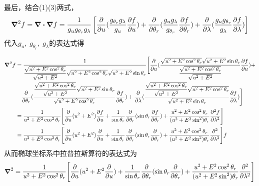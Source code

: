 \documentclass{article}
\begin{document}
最后，结合(1)(3)两式，
\[
\grad^2 f = \div \grad f = \frac{1}{g_u g_{\theta_r} g_\lambda}\left[\frac{\partial}{\partial u} (\frac{g_{\theta_r} g_{\lambda}}{g_{u}}\frac{\partial f}{\partial u}) + \frac{\partial}{\partial \theta_r} (\frac{g_u g_{\lambda}}{g_{\theta_r}}\frac{\partial f}{\partial \theta_r}) + \frac{\partial}{\partial \lambda} (\frac{g_u g_{\theta_r}}{g_\lambda}\frac{\partial f}{\partial \lambda}) \right]
\]
代入$g_u,\;g_{\theta_r},\;g_\lambda$的表达式得
\newcommand{\gu}{\dfrac{\sqrt{u^2 + E^2\cos^2\theta_r}}{\sqrt{u^2+E^2}}}
\newcommand{\gthetar}{\sqrt{u^2 + E^2\cos^2\theta_r}}
\newcommand{\glambda}{\sqrt{u^2+E^2}\sin\theta_r}

\begin{align*}
\grad^2 f & =  \dfrac{1}{\gu \gthetar \glambda}\Bigg[\dfrac{\partial}{\partial u} (\dfrac{\gthetar \glambda}{\gu}\dfrac{\partial f}{\partial u}) + \\ & \quad \dfrac{\partial}{\partial \theta_r} (\dfrac{\gu \glambda}{\gthetar}\dfrac{\partial f}{\partial \theta_r}) + \dfrac{\partial}{\partial \lambda}  (\dfrac{\gu\gthetar}{\glambda}\dfrac{\partial f}{\partial \lambda}) \Bigg]\\
& = \frac{1}{u^2+E^2\cos^2\theta_r}\Bigg[\dfrac{\partial}{\partial u}(u^2+E^2) \dfrac{\partial f}{\partial u} + \frac{1}{\sin \theta_r}\dfrac{\partial}{\partial \theta_r}(\sin \theta_r \dfrac{\partial f}{\partial \theta_r}) + \dfrac{u^2 + E^2 \cos^2 \theta_r }{(u^2+E^2\sin^2)\theta_r} \dfrac{\partial^2 f}{\partial \lambda^2}\Bigg]\\
& = \frac{1}{u^2+E^2\cos^2\theta_r}\Bigg[\dfrac{\partial}{\partial u}(u^2+E^2) \dfrac{\partial}{\partial u} + \frac{1}{\sin \theta_r}\dfrac{\partial}{\partial \theta_r}(\sin \theta_r \dfrac{\partial}{\partial \theta_r}) + \dfrac{u^2 + E^2 \cos^2 \theta_r }{(u^2+E^2\sin^2)\theta_r} \dfrac{\partial^2}{\partial \lambda^2}\Bigg] f
\end{align*}
从而椭球坐标系中拉普拉斯算符的表达式为
\[
\grad^2 = \frac{1}{u^2+E^2\cos^2\theta_r}\Bigg[\dfrac{\partial}{\partial u}(u^2+E^2 \dfrac{\partial}{\partial u}) + \frac{1}{\sin \theta_r}\dfrac{\partial}{\partial \theta_r}(\sin \theta_r \dfrac{\partial}{\partial \theta_r}) + \dfrac{u^2 + E^2 \cos^2 \theta_r }{(u^2+E^2\sin^2)\theta_r} \dfrac{\partial^2}{\partial \lambda^2}\Bigg]
\]
\end{document}

